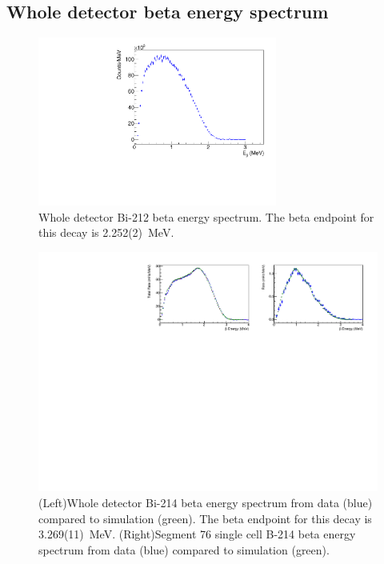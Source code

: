 \subsection{Whole detector beta energy spectrum}
\begin{figure}[!h]
\centering
\includegraphics[width=0.7\textwidth]{figures/PubBiPo212BetaE.pdf}
\caption{\label{fig:BetaE212}Whole detector Bi-212 beta energy spectrum. The beta endpoint for this decay is 2.252(2)~MeV.}
\end{figure}
\begin{figure}[!h]
\centering
\includegraphics[width=1.0\textwidth]{figures/PubBi214BetaEsimCompare.pdf}
\caption{\label{fig:BetaE214}(Left)Whole detector Bi-214 beta energy spectrum from data (blue) compared to simulation (green). The beta endpoint for this decay is 3.269(11)~MeV. (Right)Segment 76 single cell B-214 beta energy spectrum from data (blue) compared to simulation (green).}
\end{figure}
\clearpage
\newpage
